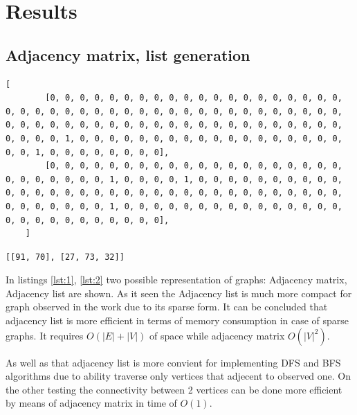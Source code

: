 \section*{Results}

\subsection*{Adjacency matrix, list generation}

\begin{lstlisting}[caption=1-2 lines of adjacency matrix, label=lst:1]
    [
        [0, 0, 0, 0, 0, 0, 0, 0, 0, 0, 0, 0, 0, 0, 0, 0, 0, 0, 0, 0, 0, 0, 0, 0, 0, 0, 0, 0, 0, 0, 0, 0, 0, 0, 0, 0, 0, 0, 0, 0, 0, 0, 0, 0, 0, 0, 0, 0, 0, 0, 0, 0, 0, 0, 0, 0, 0, 0, 0, 0, 0, 0, 0, 0, 0, 0, 0, 0, 0, 0, 1, 0, 0, 0, 0, 0, 0, 0, 0, 0, 0, 0, 0, 0, 0, 0, 0, 0, 0, 0, 0, 1, 0, 0, 0, 0, 0, 0, 0, 0], 
        [0, 0, 0, 0, 0, 0, 0, 0, 0, 0, 0, 0, 0, 0, 0, 0, 0, 0, 0, 0, 0, 0, 0, 0, 0, 0, 0, 1, 0, 0, 0, 0, 1, 0, 0, 0, 0, 0, 0, 0, 0, 0, 0, 0, 0, 0, 0, 0, 0, 0, 0, 0, 0, 0, 0, 0, 0, 0, 0, 0, 0, 0, 0, 0, 0, 0, 0, 0, 0, 0, 0, 0, 0, 1, 0, 0, 0, 0, 0, 0, 0, 0, 0, 0, 0, 0, 0, 0, 0, 0, 0, 0, 0, 0, 0, 0, 0, 0, 0, 0], 
    ]
\end{lstlisting}

\begin{lstlisting}[caption=Adjacency for 1-2 vertices, label=lst:2]
    [[91, 70], [27, 73, 32]]
\end{lstlisting}

In listings \ref{lst:1}, \ref{lst:2} two possible representation of graphs: Adjacency matrix, Adjacency list are shown.
As it seen the Adjacency list is much more compact for graph observed in the work due to its sparse form. It can be concluded that adjacency list is more efficient in terms of memory consumption in case of sparse graphs.
It requires $O(|E| + |V|)$ of space while adjacency matrix $O(|V|^2)$.

As well as that adjacency list is more convient for implementing DFS and BFS algorithms due to ability traverse only vertices that adjecent to observed one. On the other testing the connectivity between 2 vertices can be done more efficient by means of adjacency matrix in time of $O(1)$.


